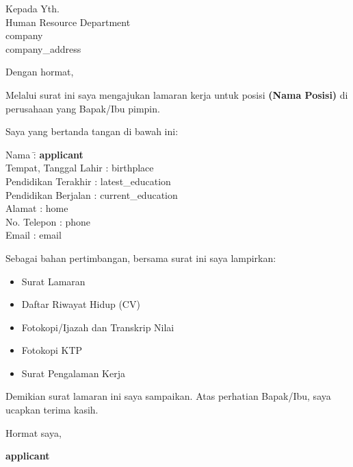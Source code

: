 \documentclass[11pt,a4paper]{letter}
\begin{document}
\onehalfspacing

\begin{letter}{%
Kepada Yth.\\
Human Resource Department\\
{{company}}\\ %
{{company_address}} %
}

\opening{Dengan hormat,}

Melalui surat ini saya mengajukan lamaran kerja untuk posisi \textbf{(Nama Posisi)} di perusahaan yang Bapak/Ibu pimpin.

Saya yang bertanda tangan di bawah ini:

\begin{tabbing}
Nama \hspace{3cm} \= : \textbf{ {{applicant}} } \\
Tempat, Tanggal Lahir \> : {{birthplace}} \\
Pendidikan Terakhir \> : {{latest_education}} \\
Pendidikan Berjalan \> : {{current_education}} \\
Alamat \> : {{home}} \\
No. Telepon \> : {{phone}} \\
Email \> : {{email}}
\end{tabbing}

Sebagai bahan pertimbangan, bersama surat ini saya lampirkan:
\begin{itemize}
\item Surat Lamaran
\item Daftar Riwayat Hidup (CV)
\item Fotokopi/Ijazah dan Transkrip Nilai
\item Fotokopi KTP
\item Surat Pengalaman Kerja
\end{itemize}

Demikian surat lamaran ini saya sampaikan. Atas perhatian Bapak/Ibu, saya ucapkan terima kasih.

\closing{Hormat saya,}

\vspace{1.5cm}

\textbf{ {{applicant}} }

\end{letter}
\end{document}
